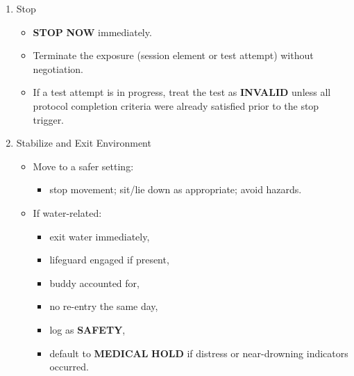 \documentclass[10pt]{article}
\begin{document}
\begin{enumerate}
\item Stop
  \begin{itemize}
  \item \textbf{STOP} \textbf{NOW} immediately.
  \item Terminate the exposure (session element or test attempt) without negotiation.
  \item If a test attempt is in progress, treat the test as \textbf{INVALID} unless all protocol completion criteria were already satisfied prior to the stop trigger.
  \end{itemize}

\item Stabilize and Exit Environment
  \begin{itemize}
  \item Move to a safer setting:
    \begin{itemize}
    \item stop movement; sit/lie down as appropriate; avoid hazards.
    \end{itemize}
  \item If water-related:
    \begin{itemize}
    \item exit water immediately,
    \item lifeguard engaged if present,
    \item buddy accounted for,
    \item no re-entry the same day,
    \item log as \textbf{SAFETY},
    \item default to \textbf{MEDICAL} \textbf{HOLD} if distress or near-drowning indicators occurred.
    \end{itemize}
  \end{itemize}


\end{enumerate}
\end{document}
